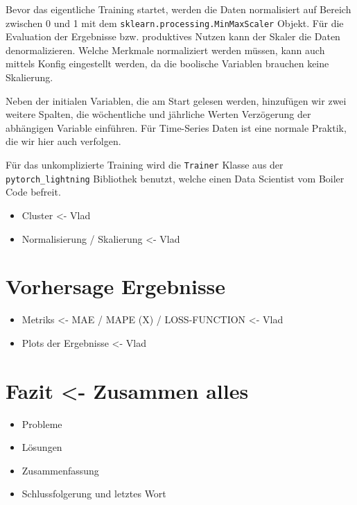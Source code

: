 \documentclass[11pt,ngerman,a4paper,]{article}
\providecommand{\tightlist}{%
  \setlength{\itemsep}{0pt}\setlength{\parskip}{0pt}}
\begin{document}
Bevor das eigentliche Training startet, werden die Daten normalisiert auf Bereich zwischen 0 und 1 mit dem \texttt{sklearn.processing.MinMaxScaler} Objekt. Für die Evaluation der Ergebnisse bzw. produktives Nutzen kann der Skaler die Daten denormalizieren. Welche Merkmale normaliziert werden müssen, kann auch mittels Konfig eingestellt werden, da die boolische Variablen brauchen keine Skalierung.

Neben der initialen Variablen, die am Start gelesen werden, hinzufügen wir zwei weitere Spalten, die wöchentliche und jährliche Werten Verzögerung der abhängigen Variable einführen. Für Time-Series Daten ist eine normale Praktik, die wir hier auch verfolgen.

Für das unkomplizierte Training wird die \texttt{Trainer} Klasse aus der \texttt{pytorch\_lightning} Bibliothek benutzt, welche einen Data Scientist vom Boiler Code befreit.

\begin{itemize}
\tightlist
\item
  Cluster \textless- Vlad
\item
  Normalisierung / Skalierung \textless- Vlad
\end{itemize}

\section{Vorhersage Ergebnisse}\label{vorhersage-ergebnisse}

\begin{itemize}
\tightlist
\item
  Metriks \textless- MAE / MAPE (X) / LOSS-FUNCTION \textless- Vlad
\item
  Plots der Ergebnisse \textless- Vlad
\end{itemize}

\section{Fazit \textless- Zusammen alles}\label{fazit---zusammen-alles}

\begin{itemize}
\tightlist
\item
  Probleme
\item
  Lösungen
\item
  Zusammenfassung
\item
  Schlussfolgerung und letztes Wort
\end{itemize}
\end{document}
